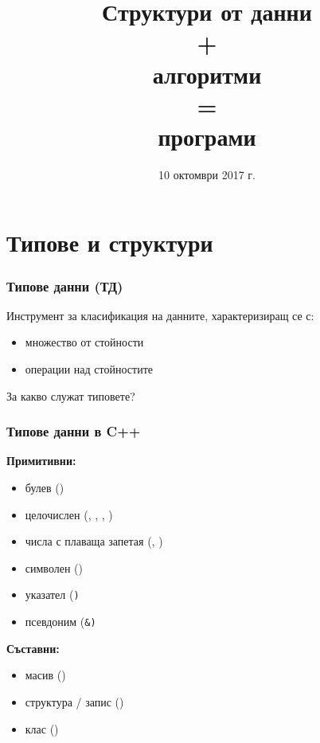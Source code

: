 \documentclass{beamer}
\title[СД+А=П]{Структури от данни\\+\\алгоритми\\=\\програми}
\date{10 октомври 2017 г.}
\begin{document}
\begin{frame}
  \titlepage
\end{frame}

\section{Типове и структури}

\begin{frame}
  \frametitle{Типове данни (ТД)}

  Инструмент за класификация на данните, характеризиращ се с:
  \begin{itemize}
  \item множество от стойности
  \item операции над стойностите
  \end{itemize}
  \vspace{1em}
  \pause
  \alert{За какво служат типовете?}
\end{frame}

\begin{frame}
  \frametitle{Типове данни в C++}

  \textbf{Примитивни:}
  \begin{itemize}
  \item булев ()
  \item целочислен (, , , )
  \item числа с плаваща запетая (, )
  \item символен ()
  \item указател (\tt*)
  \item псевдоним (\tt\&)
  \end{itemize}

  \textbf{Съставни:}
  \begin{itemize}
  \item масив (\lst{[]})
  \item структура / запис ()
  \item клас ()
  \end{itemize}
\end{frame}
\end{document}

